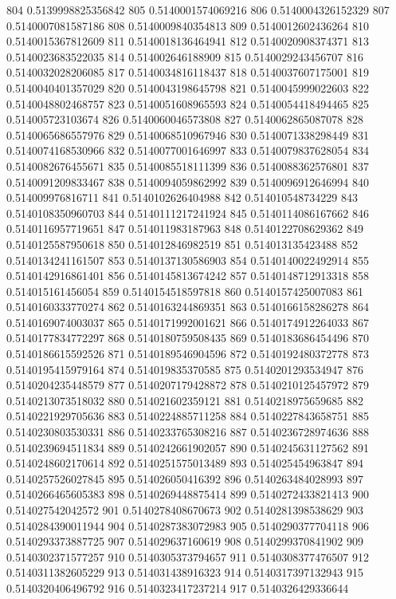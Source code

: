 804 0.5139998825356842
805 0.5140001574069216
806 0.5140004326152329
807 0.5140007081587186
808 0.5140009840354813
809 0.5140012602436264
810 0.5140015367812609
811 0.5140018136464941
812 0.5140020908374371
813 0.5140023683522035
814 0.514002646188909
815 0.5140029243456707
816 0.5140032028206085
817 0.5140034816118437
818 0.5140037607175001
819 0.5140040401357029
820 0.5140043198645798
821 0.5140045999022603
822 0.5140048802468757
823 0.5140051608965593
824 0.5140054418494465
825 0.514005723103674
826 0.5140060046573808
827 0.5140062865087078
828 0.5140065686557976
829 0.5140068510967946
830 0.5140071338298449
831 0.5140074168530966
832 0.5140077001646997
833 0.5140079837628054
834 0.5140082676455671
835 0.5140085518111399
836 0.5140088362576801
837 0.5140091209833467
838 0.5140094059862992
839 0.5140096912646994
840 0.514009976816711
841 0.5140102626404988
842 0.514010548734229
843 0.5140108350960703
844 0.5140111217241924
845 0.5140114086167662
846 0.5140116957719651
847 0.514011983187963
848 0.5140122708629362
849 0.5140125587950618
850 0.514012846982519
851 0.514013135423488
852 0.5140134241161507
853 0.5140137130586903
854 0.5140140022492914
855 0.5140142916861401
856 0.5140145813674242
857 0.5140148712913318
858 0.514015161456054
859 0.5140154518597818
860 0.5140157425007083
861 0.5140160333770274
862 0.5140163244869351
863 0.5140166158286278
864 0.5140169074003037
865 0.5140171992001621
866 0.5140174912264033
867 0.5140177834772297
868 0.5140180759508435
869 0.5140183686454496
870 0.5140186615592526
871 0.5140189546904596
872 0.5140192480372778
873 0.5140195415979164
874 0.514019835370585
875 0.5140201293534947
876 0.5140204235448579
877 0.5140207179428872
878 0.5140210125457972
879 0.5140213073518032
880 0.514021602359121
881 0.5140218975659685
882 0.5140221929705636
883 0.5140224885711258
884 0.5140227843658751
885 0.5140230803530331
886 0.5140233765308216
887 0.5140236728974636
888 0.5140239694511834
889 0.5140242661902057
890 0.5140245631127562
891 0.5140248602170614
892 0.5140251575013489
893 0.514025454963847
894 0.5140257526027845
895 0.514026050416392
896 0.5140263484028993
897 0.5140266465605383
898 0.5140269448875414
899 0.5140272433821413
900 0.514027542042572
901 0.5140278408670673
902 0.5140281398538629
903 0.5140284390011944
904 0.5140287383072983
905 0.5140290377704118
906 0.5140293373887725
907 0.514029637160619
908 0.5140299370841902
909 0.5140302371577257
910 0.5140305373794657
911 0.5140308377476507
912 0.5140311382605229
913 0.514031438916323
914 0.5140317397132943
915 0.5140320406496792
916 0.5140323417237214
917 0.5140326429336644
